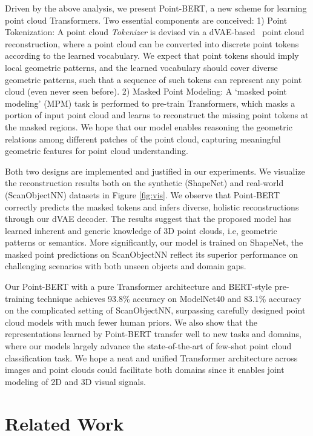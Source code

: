 	
Driven by the above analysis, we present Point-BERT, a new scheme for learning point cloud Transformers. Two essential components are conceived: 1) Point Tokenization:  A  point cloud \textit{Tokenizer} is devised via a dVAE-based~\cite{rolfe2016discrete} point cloud reconstruction, where a point cloud can be converted into discrete point tokens according to the learned vocabulary. We expect that point tokens should imply local geometric patterns, and the learned vocabulary should cover diverse geometric patterns, such that a sequence of such tokens can represent any point cloud (even never seen before). 2) Masked Point Modeling: A `masked point modeling' (MPM) task is performed to pre-train Transformers, which masks a portion of input point cloud and learns to reconstruct the missing point tokens at the masked regions. We hope that our model enables reasoning the geometric relations among different patches of the point cloud, capturing meaningful geometric features for point cloud understanding.

Both two designs are implemented and justified in our experiments. 
We visualize the reconstruction results both on the synthetic (ShapeNet\cite{shapenet}) and real-world (ScanObjectNN\cite{uy2019revisiting}) datasets in Figure \ref{fig:vis}. We observe that Point-BERT correctly predicts the masked tokens and infers diverse, holistic reconstructions through our dVAE decoder. The results suggest that the proposed model has learned inherent and generic knowledge of 3D point clouds, i.e, geometric patterns or semantics. More significantly, our model is trained on  ShapeNet, the masked point predictions on ScanObjectNN reflect its superior performance on challenging scenarios with both unseen objects and domain gaps. 

 Our Point-BERT with a pure Transformer architecture and BERT-style pre-training technique achieves  93.8\% accuracy on ModelNet40 and 83.1\% accuracy on the complicated setting of ScanObjectNN, surpassing carefully designed point cloud models with much fewer human priors. We also show that the representations learned by Point-BERT transfer well to new tasks and domains, where our models largely advance the state-of-the-art of few-shot point cloud classification task. We hope a neat and unified Transformer architecture across images and point clouds could facilitate both domains since it enables joint modeling of 2D and 3D visual signals. 

\section{Related Work}
	

